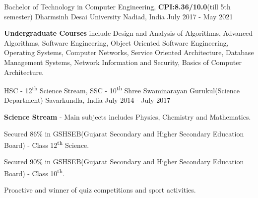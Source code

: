 
\begin{cventries}
  \cventry
    {Bachelor of Technology in Computer Engineering, \textbf{CPI:8.36/10.0}(till 5th semester)} %
    {Dharmsinh Desai University} %
    {Nadiad, India} %
    {July 2017 - May 2021} %
    {
      \begin{cvitems} %
         \item {\textbf{Undergraduate Courses} include Design and Analysis of Algorithms, Advanced Algorithms, Software Engineering, Object Oriented
Software Engineering, Operating Systems, Computer Networks, Service Oriented Architecture, Database Management Systems,
Network Information and Security, Basics of Computer Architecture.}
         \vspace{0.5mm}
      \end{cvitems}
    }
    
\end{cventries}
\begin{cventries}
  \cventry
    {HSC - 12\textsuperscript{th} Science Stream, SSC - 10\textsuperscript{th}} %
    {Shree Swaminarayan Gurukul(Science Department)} %
    {Savarkundla, India} %
    {July 2014 - July 2017} %
    {
      \begin{cvitems} %
         \item {\textbf{Science Stream} -  Main subjects includes Physics, Chemistry and Mathematics.}
         \vspace{0.5mm}
          \item {Secured 86\% in GSHSEB(Gujarat Secondary and Higher Secondary Education Board) - Class 12\textsuperscript{th} Science.}
          \vspace{0.5mm}
          \item {Secured 90\% in GSHSEB(Gujarat Secondary and Higher Secondary Education Board) - Class 10\textsuperscript{th}.}
          \vspace{0.5mm}
          \item {Proactive and winner of quiz competitions and sport activities.}
          \vspace{0.5mm}
      \end{cvitems}
    }
    
\end{cventries}
